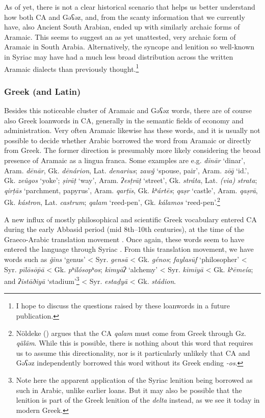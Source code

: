 \documentclass[output=paper]{langsci/langscibook}
\begin{document}
As of yet, there is not a clear historical scenario that helps us better understand how both CA and Gəʕəz, and, from the scanty information that we currently have, also Ancient South Arabian, ended up with similarly archaic forms of Aramaic. This seems to suggest an as yet unattested, very archaic form of Aramaic in South Arabia. Alternatively, the syncope and lenition so well-known in Syriac may have had a much less broad distribution across the written Aramaic dialects than previously thought.\footnote{I hope to discuss the questions raised by these loanwords in a future publication.}

\subsubsection{\label{bkm:Ref13224479}Greek (and Latin)}

Besides this noticeable cluster of Aramaic and Gəʕəz words, there are of course also Greek loanwords in CA, generally in the semantic fields of economy and administration. Very often Aramaic likewise has these words, and it is usually not possible to decide whether Arabic borrowed the word from Aramaic or directly from Greek. The former direction is presumably more likely considering the broad presence of Aramaic as a lingua franca. Some examples are e.g. \textit{dīnār} ‘dinar’, Aram. \textit{dēnār}, Gk. \textit{dēnárion}, Lat. \textit{denarius}; \textit{zawǧ} ‘spouse, pair’, Aram. \textit{zōḡ} ‘id.’, Gk. \textit{zeûgos} ‘yoke’; \textit{ṣirāṭ} ‘way’, Aram. \textit{ʔesṭrāṭ} ‘street’, Gk. \textit{stráta}, Lat. \textit{(via)} \textit{strata}; \textit{qirṭās} ‘parchment, papyrus’, Aram. \textit{qarṭīs}, Gk. \textit{kʰártēs}; \textit{qaṣr} ‘castle’, Aram. \textit{qaṣrā}, Gk. \textit{kástron}, Lat. \textit{castrum}; \textit{qalam} ‘reed-pen’, Gk. \textit{kálamos} ‘reed-pen’.\footnote{Nöldeke (\citeyear[50]{Nöldeke1910}) argues that the CA \textit{qalam} must come from Greek through Gz. \textit{qäläm}. While this is possible, there is nothing about this word that requires us to assume this directionality, nor is it particularly unlikely that CA and Gəʕəz independently borrowed this word without its Greek ending \textit{-os}.}

A new influx of mostly philosophical and scientific Greek vocabulary entered CA during the early Abbasid period (mid 8th–10th centuries), at the time of the Graeco-Arabic translation movement \citep{Gutas1998}. Once again, these words seem to have entered the language through Syriac \citep{Gutas2011}. From this translation movement, we have words such as \textit{ǧins} ‘genus’ < Syr. \textit{gensā} < Gk. \textit{génos}; \textit{faylasūf} ‘philosopher’ < Syr. \textit{pīlōsōp̄ā} < Gk. \textit{pʰilósopʰos}; \textit{kīmyāʔ} ‘alchemy’ < Syr. \textit{kīmīyā} < Gk. \textit{kʰēmeía}; and \textit{ʔistāðiyā} ‘stadium’\footnote{Note here the apparent application of the Syriac lenition being borrowed as such in Arabic, unlike earlier loans. But it may also be possible that the lenition is part of the Greek lenition of the \textit{delta} instead, as we see it today in modern Greek.} < Syr. \textit{estaḏyā} < Gk. \textit{stádion}.
\end{document}
